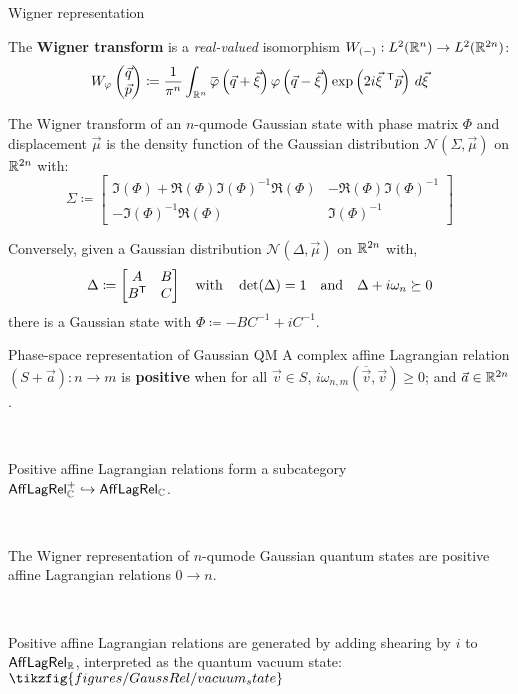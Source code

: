 \documentclass{beamer}
\begin{document}
\begin{frame}{Wigner representation}

  The \textbf{Wigner transform} is a \emph{real-valued} isomorphism \(W_{(-)} : L^2 (\mathbb{R}^{n})\to L^2 (\mathbb{R}^{2n})\):
  \[
    W_{\phi}\begin{pmatrix}\vec q \\ \vec p \end{pmatrix}\coloneqq \frac{1}{\pi^n }\int_{\R^n } \overline{\varphi}\left(\vec q+\vec \xi\right)\varphi\left(\vec q -\vec \xi\right)\exp\left(2i\vec{\xi}{\ }^\trans \vec p\right)\, d\vec \xi
  \]
  
  
  The Wigner transform of an \(n\)-qumode Gaussian state with phase
	matrix \(\Phi\) and displacement \(\vec \mu\) is the density function
	of the Gaussian distribution \({\mathcal N}(\Sigma,\vec \mu)\) on
	\(\mathbb{R}^{2n}\) with:
	\[
	  \Sigma\coloneqq \begin{bmatrix}
	  \Im (\Phi) + \Re(\Phi)\Im(\Phi)^{-1} \Re(\Phi)  & -\Re(\Phi)\Im(\Phi)^{-1} \\ -\Im(\Phi)^{-1} \Re(\Phi) & \Im(\Phi)^{-1}
	  \end{bmatrix}
	\]
  
  
  	Conversely, given a Gaussian distribution \({\mathcal N}\left(\Delta,\vec \mu\right)\)
	on \(\mathbb{R}^{2n}\) with,
  \[
	  \Delta\coloneqq
	  \begin{bmatrix}
	  	A & B \\ B^{\mathsf{T}} & C 
	  \end{bmatrix}
	  \quad
	  \text{with}
	  \quad
	  \det(\Delta)=1
	  \quad
	  \text{and}
	  \quad
	   \Delta + i \omega_n \succeq 0
  \]
    there is a Gaussian state with  \(\Phi\coloneqq -BC^{-1} + i C^{-1}\).
\end{frame}


\begin{frame}{Phase-space representation of Gaussian QM}
 A  complex affine Lagrangian relation \((S+\vec a):n\to m\) is  \textbf{positive} when for all  \(\vec v\in S\),  \(i\omega_{n,m}\!\left(\overline{\vec v}, \vec v\right) \geq 0\); and
  \(\vec a \in \mathbb{R}^{2n}\).
 
 \
 
Positive affine Lagrangian relations form a subcategory\\
 \(\ALR[\C]^+\hookrightarrow \ALR[\C]\).

\

The Wigner representation of \(n\)-qumode Gaussian quantum states are positive affine Lagrangian relations \(0\to n\).

\

Positive affine Lagrangian relations are generated by adding  shearing by \(i\) to \(\ALR[\R]\), interpreted as the quantum vacuum state: \(\tikzfig{figures/GaussRel/vacuum_state}\)

\end{frame}
\end{document}
